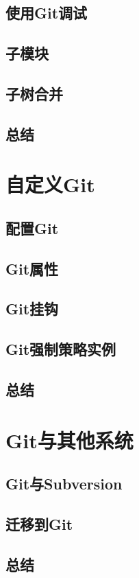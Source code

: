 \documentclass{book}
\begin{document}
	\section{使用Git调试}
	\section{子模块}
	\section{子树合并}
	\section{总结}

\chapter{自定义Git}
	\section{配置Git}
	\section{Git属性}
	\section{Git挂钩}
	\section{Git强制策略实例}
	\section{总结}

\chapter{Git与其他系统}
	\section{Git与Subversion}
	\section{迁移到Git}
	\section{总结}
	
\end{document}
